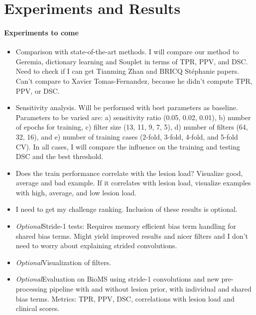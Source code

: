 %

\section{Experiments and Results}

\paragraph{Experiments to come}

\begin{itemize}
  
\item Comparison with state-of-the-art methods. I will compare our method to
Geremia, dictionary learning and Souplet in terms of TPR, PPV, and DSC. Need to
check if I can get Tianming Zhan and  BRICQ St\'ephanie papers. Can't compare to
Xavier Tomas-Fernandez, because he didn't compute TPR, PPV, or DSC.

\item Sensitivity analysis. Will be performed with best parameters as baseline.
Parameters to be varied are: a) sensitivity ratio (0.05, 0.02, 0.01), b) number
of epochs for training, c) filter size (13, 11, 9, 7, 5), d) number of filters
(64, 32, 16), and e) number of training cases (2-fold, 3-fold, 4-fold, and
5-fold CV). In all cases, I will compare the influence on the training and
testing DSC and the best threshold.

\item Does the train performance correlate with the lesion load? Visualize good,
average and bad example. If it correlates with lesion load, visualize examples
with high, average, and low lesion load.

\item I need to get my challenge ranking. Inclusion of these results is
optional.

\item \emph{Optional}\quad Stride-1 tests: Requires memory efficient bias term
handling for shared bias terms. Might yield improved results and nicer filters
and I don't need to worry about explaining strided convolutions.

\item \emph{Optional}\quad Visualization of filters.

\item \emph{Optional}\quad Evaluation on BioMS using stride-1 convolutions and
new pre-processing pipeline with and without lesion prior, with individual and
shared bias terms. Metrics: TPR, PPV, DSC, correlations with lesion load and
clinical scores.

\end{itemize}

